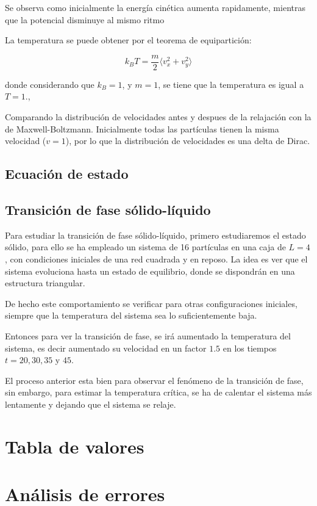 \documentclass[11pt, twoside]{article} %
\begin{document}
Se observa como inicialmente la energía cinética aumenta rapidamente, mientras que
la potencial disminuye al mismo ritmo

La temperatura se puede obtener por el teorema de equipartición:

\begin{equation}
    k_B T = \frac{m}{2}\langle v_x^2 + v_y^2 \rangle
\end{equation}

donde considerando que $k_B =1$, y $m=1$, se tiene que la temperatura es igual a
$T = 1.$, 

Comparando la distribución de velocidades antes y despues de la relajación con la 
de Maxwell-Boltzmann. Inicialmente todas las partículas tienen la misma velocidad
($v=1$), por lo que la distribución de velocidades es una delta de Dirac.

\subsection{Ecuación de estado}

\subsection{Transición de fase sólido-líquido}
Para estudiar la transición de fase sólido-líquido, primero estudiaremos el estado
sólido, para ello se ha empleado un sistema de 16 partículas en una caja de 
$L=4$, con condiciones iniciales de una red cuadrada y en reposo. La idea es ver 
que el sistema evoluciona hasta un estado de equilibrio, donde se dispondrán 
en una estructura triangular.


De hecho este comportamiento se verificar para otras configuraciones iniciales, 
siempre que la temperatura del sistema sea lo suficientemente baja.

Entonces para ver la transición de fase, se irá aumentado la temperatura del sistema, 
es decir aumentado su velocidad en un factor $1.5$ en los tiempos 
$t=20, 30, 35$ y $45$.


El proceso anterior esta bien para observar el fenómeno de la transición de fase,
sin embargo, para estimar la temperatura crítica, se ha de calentar el sistema más lentamente
y dejando que el sistema se relaje.


\newpage

\appendix

\section{Tabla de valores}


\newpage

\section{Análisis de errores}
\end{document}
